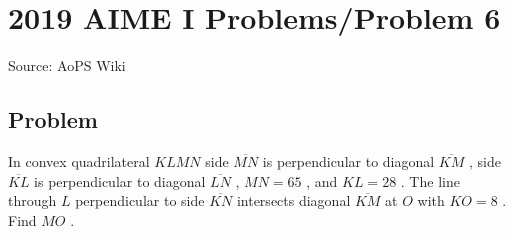 \documentclass[12pt]{article}
\begin{document}
\section*{{2019 AIME I Problems/Problem 6}}
Source: AoPS Wiki

\subsection*{Problem}
In convex quadrilateral $KLMN$ side $\overline{MN}$ is perpendicular to diagonal $\overline{KM}$ , side $\overline{KL}$ is perpendicular to diagonal $\overline{LN}$ , $MN = 65$ , and $KL = 28$ . The line through $L$ perpendicular to side $\overline{KN}$ intersects diagonal $\overline{KM}$ at $O$ with $KO = 8$ . Find $MO$ .
\end{document}
